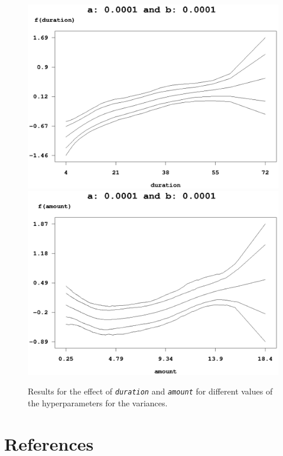 \begin{figure}[ht]
\begin{center}
\vspace{0.5cm}
\includegraphics[scale=0.4]{grafiken/credit_duration_a0001b0001.ps} \hspace{0.3cm}
\includegraphics[scale=0.4]{grafiken/credit_amount_a0001b0001.ps}
\end{center}
{\em\caption{ \label{credit_varhyper} Results for the effect of
{\em\tt duration} and {\em\tt amount} for different values of the
hyperparameters for the variances.}}
\end{figure}

\section{References}
\label{zambia_bayesregref}

